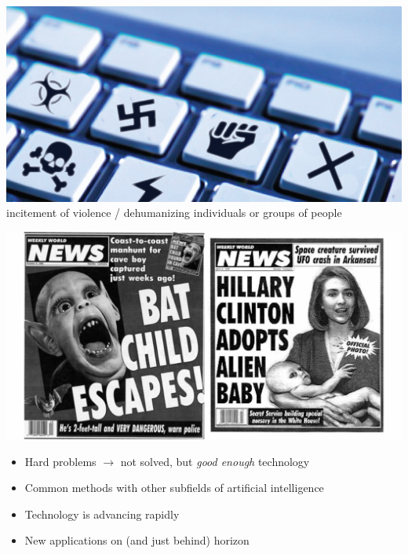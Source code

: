 \documentclass[landscape]{jhuslides3C}
\begin{document}

\vfill
\begin{center}
\includegraphics[width=20cm]{hate-speech.png}\\[1cm]
incitement of violence / dehumanizing individuals or groups of people
\end{center}
\vfill


\vfill
\begin{center}
\includegraphics[width=25cm]{fake-news3.png}
\end{center}
\vfill


\vfill
\begin{itemize}
\item Hard problems $\rightarrow$ not solved, but {\em good enough} technology
\item Common methods with other subfields of artificial intelligence
\item Technology is advancing rapidly
\item New applications on (and just behind) horizon
\end{itemize}
\vfill

\end{document}
